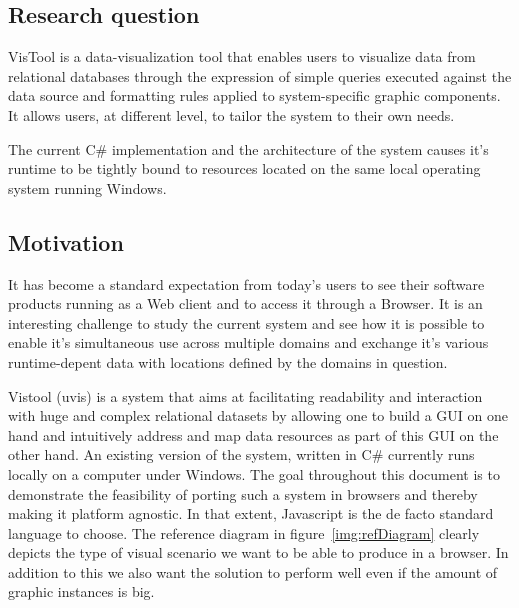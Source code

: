 \subsection{Research question}

VisTool is a data-visualization tool that enables users to visualize data from relational databases through the expression of simple queries executed against the data source and formatting rules applied to system-specific graphic components. It allows users, at different level, to tailor the system to their own needs.

The current C\# implementation and the architecture of the system causes it's runtime to be tightly bound to resources located on the same local operating system running Windows.

\subsection{Motivation}

It has become a standard expectation from today's users to see their software products running as a Web client and to access it through a Browser. It is an interesting challenge to study the current system and see how it is possible to enable it's simultaneous use across multiple domains and exchange it's various runtime-depent data with locations defined by the domains in question.



\iffalse
Vistool (uvis) is a system that aims at facilitating readability and interaction with huge and complex relational datasets by allowing one to build a GUI on one hand and intuitively address and map data resources as part of this GUI on the other hand. An existing version of the system, written in C\# currently runs locally on a computer under Windows. The goal throughout this document is to demonstrate the feasibility of porting such a system in browsers and thereby making it platform agnostic. In that extent, Javascript is the de facto standard language to choose. The reference diagram in figure~\ref{img:refDiagram} clearly depicts the type of visual scenario we want to be able to produce in a browser. In addition to this we also want the solution to perform well even if the amount of graphic instances is big.

